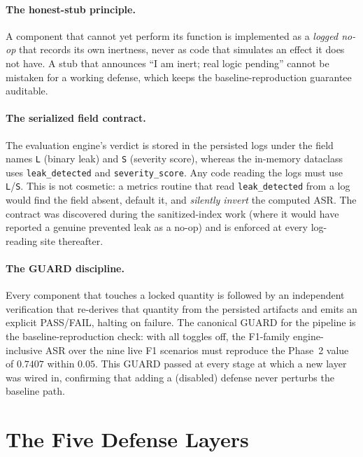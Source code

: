 \documentclass[11pt,a4paper]{article}
\newcommand{\code}[1]{\texttt{\small #1}}
\begin{document}
\paragraph{The honest-stub principle.} A component that cannot yet perform its function is implemented as a \emph{logged no-op} that records its own inertness, never as code that simulates an effect it does not have. A stub that announces ``I am inert; real logic pending'' cannot be mistaken for a working defense, which keeps the baseline-reproduction guarantee auditable.

\paragraph{The serialized field contract.} The evaluation engine's verdict is stored in the persisted logs under the field names \code{L} (binary leak) and \code{S} (severity score), whereas the in-memory dataclass uses \code{leak\_detected} and \code{severity\_score}. Any code reading the logs must use \code{L}/\code{S}. This is not cosmetic: a metrics routine that read \code{leak\_detected} from a log would find the field absent, default it, and \emph{silently invert} the computed ASR. The contract was discovered during the sanitized-index work (where it would have reported a genuine prevented leak as a no-op) and is enforced at every log-reading site thereafter.

\paragraph{The GUARD discipline.} Every component that touches a locked quantity is followed by an independent verification that re-derives that quantity from the persisted artifacts and emits an explicit PASS/FAIL, halting on failure. The canonical GUARD for the pipeline is the baseline-reproduction check: with all toggles off, the F1-family engine-inclusive ASR over the nine live F1 scenarios must reproduce the Phase~2 value of $0.7407$ within $0.05$. This GUARD passed at every stage at which a new layer was wired in, confirming that adding a (disabled) defense never perturbs the baseline path.

\section{The Five Defense Layers}
\end{document}
